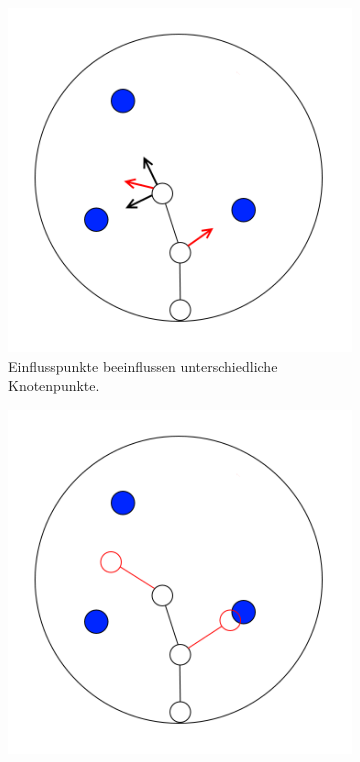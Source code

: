 \begin{figure} [hbtp]
	\begin{subfigure}[t]{.31\textwidth}
		\centering
		\includegraphics[width=\linewidth]{images/SCA_Basic7.png}
		\caption{Einflusspunkte beeinflussen unterschiedliche Knotenpunkte.}
		\label{subfig:SCA_Basic7}
	\end{subfigure}
	\hspace{.01\textwidth}
	\begin{subfigure}[t]{.31\textwidth}
		\centering
		\includegraphics[width=\linewidth]{images/SCA_Basic8.png}

\end{subfigure}
\end{figure}
